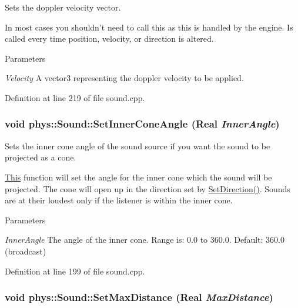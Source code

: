 Sets the doppler velocity vector. 

In most cases you shouldn't need to call this as this is handled by the engine. Is called every time position, velocity, or direction is altered. 
\begin{DoxyParams}{Parameters}
\item[{\em Velocity}]A vector3 representing the doppler velocity to be applied. \end{DoxyParams}


Definition at line 219 of file sound.cpp.

\hypertarget{classphys_1_1Sound_ae231936d44db727eb48f9ff259ae0dd6}{
\subsubsection[{SetInnerConeAngle}]{\setlength{\rightskip}{0pt plus 5cm}void phys::Sound::SetInnerConeAngle ({\bf Real} {\em InnerAngle})}}
\label{dc/d2f/classphys_1_1Sound_ae231936d44db727eb48f9ff259ae0dd6}


Sets the inner cone angle of the sound source if you want the sound to be projected as a cone. 

\hyperlink{structThis}{This} function will set the angle for the inner cone which the sound will be projected. The cone will open up in the direction set by \hyperlink{classphys_1_1Sound_af2d6aa7e1b3b2e9f60b8dbbe8aa2d381}{SetDirection()}. Sounds are at their loudest only if the listener is within the inner cone. 
\begin{DoxyParams}{Parameters}
\item[{\em InnerAngle}]The angle of the inner cone. Range is: 0.0 to 360.0. Default: 360.0 (broadcast) \end{DoxyParams}


Definition at line 199 of file sound.cpp.

\hypertarget{classphys_1_1Sound_a54d04549f0851b00736fdab18a81ec70}{
\subsubsection[{SetMaxDistance}]{\setlength{\rightskip}{0pt plus 5cm}void phys::Sound::SetMaxDistance ({\bf Real} {\em MaxDistance})}}
\label{dc/d2f/classphys_1_1Sound_a54d04549f0851b00736fdab18a81ec70}


